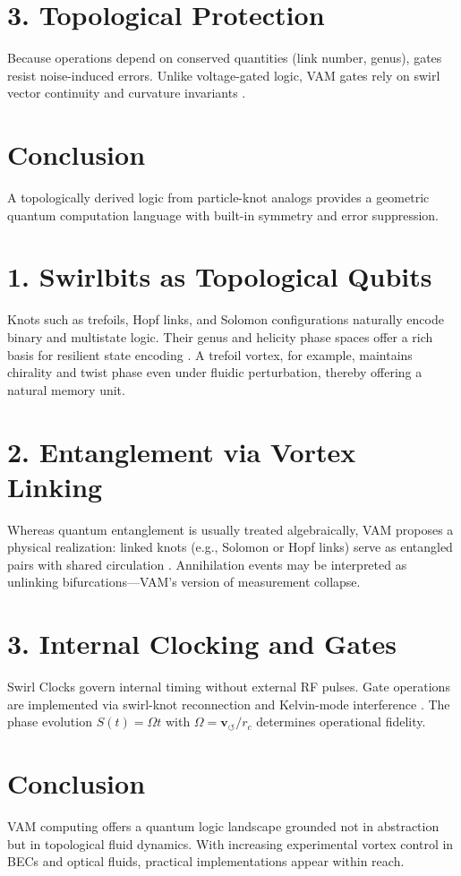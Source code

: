 \documentclass[a4paper,11pt]{article}
\begin{document}
\section*{3. Topological Protection}
Because operations depend on conserved quantities (link number, genus), gates resist noise-induced errors. Unlike voltage-gated logic, VAM gates rely on swirl vector continuity and curvature invariants \cite{Kauffman1991}.

\section*{Conclusion}
A topologically derived logic from particle-knot analogs provides a geometric quantum computation language with built-in symmetry and error suppression.


\section*{1. Swirlbits as Topological Qubits}
Knots such as trefoils, Hopf links, and Solomon configurations naturally encode binary and multistate logic. Their genus and helicity phase spaces offer a rich basis for resilient state encoding \cite{Kauffman1991,Vilenkin1994}. A trefoil vortex, for example, maintains chirality and twist phase even under fluidic perturbation, thereby offering a natural memory unit.

\section*{2. Entanglement via Vortex Linking}
Whereas quantum entanglement is usually treated algebraically, VAM proposes a physical realization: linked knots (e.g., Solomon or Hopf links) serve as entangled pairs with shared circulation \cite{Iskandarani2025,Hall2016}. Annihilation events may be interpreted as unlinking bifurcations---VAM's version of measurement collapse.

\section*{3. Internal Clocking and Gates}
Swirl Clocks govern internal timing without external RF pulses. Gate operations are implemented via swirl-knot reconnection and Kelvin-mode interference \cite{Anderson2001,Berloff2014}. The phase evolution \( S(t) = \Omega t \) with \( \Omega = \mathbf{v}_{\scriptscriptstyle\boldsymbol{\circlearrowleft}} / r_c \) determines operational fidelity.

\section*{Conclusion}
VAM computing offers a quantum logic landscape grounded not in abstraction but in topological fluid dynamics. With increasing experimental vortex control in BECs and optical fluids, practical implementations appear within reach.



\end{document}
